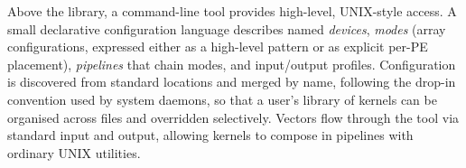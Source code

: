 Above the library, a command-line tool provides high-level, UNIX-style access.
A small declarative configuration language describes named \emph{devices},
\emph{modes} (array configurations, expressed either as a high-level pattern or
as explicit per-PE placement), \emph{pipelines} that chain modes, and
input/output profiles. Configuration is discovered from standard locations and
merged by name, following the drop-in convention used by system daemons, so
that a user's library of kernels can be organised across files and overridden
selectively. Vectors flow through the tool via standard input and output,
allowing kernels to compose in pipelines with ordinary UNIX utilities.
